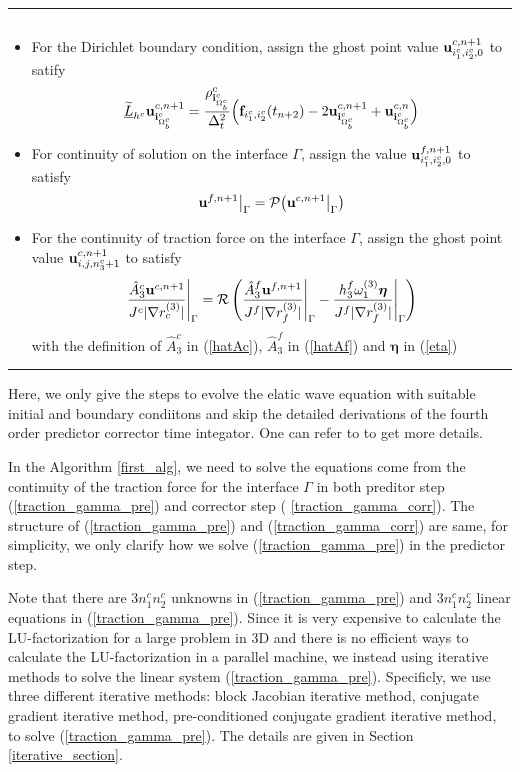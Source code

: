 \documentclass[a4paper]{article}
\makeatletter
\newenvironment{breakablealgorithm}
{%
	\begin{center}
		\refstepcounter{algorithm}%
		\hrule height.8pt depth0pt \kern2pt%
		\renewcommand{\caption}[2][\relax]{%
			{\raggedright\textbf{\ALG@name~\thealgorithm} ##2\par}%
			\ifx\relax##1\relax %
			\addcontentsline{loa}{algorithm}{\protect\numberline{\thealgorithm}##2}%
			\else %
			\addcontentsline{loa}{algorithm}{\protect\numberline{\thealgorithm}##1}%
			\fi
			\kern2pt\hrule\kern2pt
		}
	}{%
		\kern2pt\hrule\relax%
	\end{center}
}
\newcommand{\wt}{\widetilde}
\makeatother
\begin{document}
\begin{breakablealgorithm}
\begin{itemize}
{\begin{equation*}
 	\end{equation*}	
 }
 \item {For the Dirichlet boundary condition, assign the ghost point value ${\bf u}^{c,n+1}_{i^c_1,i^c_2,0}$ to satify
 	\begin{equation*}
 	\uline{\wt{L}}_{h^c}{\bf u}_{{\bf i}^c_{\Omega^c_b}}^{c,n+1} = \frac{\rho^c_{{\bf i}^c_{\Omega^c_b}}}{\Delta_t^2}\Big({\bf f} _{i^c_1,i^c_2}(t_{n+2})-2{\bf u}_{{\bf i}^c_{\Omega^c_b}}^{c,n+1}+{\bf u}_{{\bf i}^c_{\Omega^c_b}}^{c,n}\Big)
 	\end{equation*}
 }
 \item{For continuity of solution on the interface $\Gamma$, assign the value ${\bf u}^{f,n+1}_{i^c_1,i^c_2,0}$ to satisfy
	\begin{equation*}
	{\bf u}^{f,n+1}\big|_{\Gamma} = \mathcal{P}\big({\bf u}^{c,n+1}\big|_{\Gamma}\big)
	\end{equation*}
}
\item{For the continuity of traction force on the interface $\Gamma$, assign the ghost point value ${\bf u}^{c,n+1}_{i,j,n_3^c+1}$ to satisfy
	\begin{equation}\label{traction_gamma_corr}
	\frac{\hat{A}_3^c{\bf u}^{c,n+1}}{J^c|\nabla r_c^{(3)}|}\Bigg|_{\Gamma} = \mathcal{R}\left(\frac{\hat{A}_3^f{\bf u}^{f,n+1}}{J^f|\nabla r_f^{(3)}|}\Bigg|_{\Gamma} - \frac{h_3^f\omega_1^{(3)}{\bm \eta}}{J^f|\nabla r_f^{(3)}|}\Bigg|_{\Gamma}\right)
	\end{equation}
	with the definition of $\hat{A}^c_3$ in (\ref{hatAc}), $\hat{A}^f_3$ in (\ref{hatAf}) and ${\bm \eta}$ in (\ref{eta})
}
	\end{itemize}
\end{breakablealgorithm}
Here, we only give the steps to evolve the elatic wave equation with suitable initial and boundary condiitons and skip the detailed derivations of the fourth order predictor corrector time integator. One can refer to \cite{?} to get more details.

In the Algorithm \ref{first_alg}, we need to solve the equations come from the continuity of the traction force for the interface $\Gamma$ in both preditor step (\ref{traction_gamma_pre}) and corrector step (
\ref{traction_gamma_corr}). The structure of (\ref{traction_gamma_pre}) and (\ref{traction_gamma_corr}) are same, for simplicity, we only clarify how we solve (\ref{traction_gamma_pre}) in the predictor step.

Note that there are $3n_1^cn_2^c$ unknowns in (\ref{traction_gamma_pre}) and $3n_1^cn_2^c$ linear equations in (\ref{traction_gamma_pre}). Since it is very expensive to calculate the LU-factorization for a large problem in $3$D and there is no efficient ways to calculate the LU-factorization in a parallel machine, we instead using iterative methods to solve the linear system (\ref{traction_gamma_pre}). Specificly, we use three different iterative methods: block Jacobian iterative method, conjugate gradient iterative method, pre-conditioned conjugate gradient iterative method, to solve (\ref{traction_gamma_pre}). The details are given in Section \ref{iterative_section}.
\end{document}
